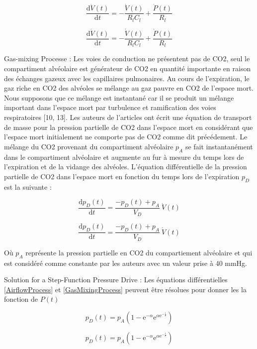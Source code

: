 \documentclass[12pt,]{article}
\begin{document}
\[ 
\frac{\mathrm{d}\dot{V}(t)}{\mathrm{d}t}=-\frac{\dot{V}(t)}{R_{l}C_{l}}+\frac{\dot{P}(t)}{R_{l}}
\]

\begin{equation}
  \frac{\mathrm{d}\dot{V}(t)}{\mathrm{d}t}=-\frac{\dot{V}(t)}{R_{l}C_{l}}+\frac{\dot{P}(t)}{R_{l}}
\label{AirflowProcess}
\end{equation}

Gas-mixing Processe : Les voies de conduction ne présentent pas de CO2,
seul le compartiment alvéolaire est générateur de CO2 en quantité
importante en raison des échanges gazeux avec les capillaires
pulmonaires. Au cours de l'expiration, le gaz riche en CO2 des alvéoles
se mélange au gaz pauvre en CO2 de l'espace mort. Nous supposons que ce
mélange est instantané car il se produit un mélange important dans
l'espace mort par turbulence et ramification des voies respiratoires
{[}10, 13{]}. Les auteurs de l'articles ont écrit une équation de
transport de masse pour la pression partielle de CO2 dans l'espace mort
en considérant que l'espace mort initialement ne comporte pas de CO2
comme dit précédement. Le mélange du CO2 provenant du compartiment
alvéolaire \(p_{A}\) se fait instantanément dans le compartiment
alvéolaire et augmente au fur à mesure du temps lors de l'expiration et
de la vidange des alvéoles. L'équation différentielle de la pression
partielle de CO2 dans l'espace mort en fonction du temps lors de
l'expiration \(p_{D}\) est la suivante :

\[ 
\frac{\mathrm{d}p_{D}(t)}{\mathrm{d}t}=\frac{-p_{D}(t)+p_{A}}{V_{D}} \ \dot{V}(t) 
\]

\begin{equation}
  \frac{\mathrm{d}p_{D}(t)}{\mathrm{d}t}=\frac{-p_{D}(t)+p_{A}}{V_{D}} \ \dot{V}(t)
\label{GasMixingProcess}
\end{equation}

Où \(p_{A}\) représente la pression partielle en CO2 du compartiement
alvéolaire et qui est considéré comme constante par les auteurs avec un
valeur prise à 40 mmHg.

Solution for a Step-Function Pressure Drive : Les équations
différentielles \eqref{AirflowProcess} et \eqref{GasMixingProcess}
peuvent être résolues pour donner les la fonction de \(P(t)\)

\[ 
p_{D}(t)=p_{A} (1-\mathrm{e}^{-\alpha} \mathrm{e}^{\alpha\mathrm{e}^{-\frac{t}{\tau}}})  
\tag{2}
\]

\begin{equation}
  p_{D}(t)=p_{A} (1-\mathrm{e}^{-\alpha} \mathrm{e}^{\alpha\mathrm{e}^{-\frac{t}{\tau}}})
\label{eq:modèle mécanique 2}
\end{equation}
\end{document}
